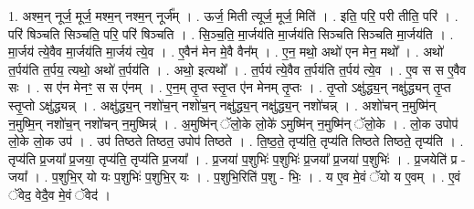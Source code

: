\documentclass[17pt]{extarticle}
\begin{document}
1. अश्म॒न् नूर्ज॒ मूर्ज॒ मश्म॒न् नश्म॒न् नूर्ज᳚म् । . ऊर्ज॒ मिती त्यूर्ज॒ मूर्ज॒ मिति॑ । . इति॒ परि॒ परी तीति॒ परि॑ । . परि॑ षिञ्चति सिञ्चति॒ परि॒ परि॑ षिञ्चति । . सि॒ञ्च॒ति॒ मा॒र्जय॑ति मा॒र्जय॑ति सिञ्चति सिञ्चति मा॒र्जय॑ति । . मा॒र्जय॑ त्ये॒वैव मा॒र्जय॑ति मा॒र्जय॑ त्ये॒व । . ए॒वैन॑ मेन मे॒वै वैन᳚म् । . ए॒न॒ मथो॒ अथो॑ एन मेन॒ मथो᳚ । . अथो॑ त॒र्पय॑ति त॒र्पय॒ त्यथो॒ अथो॑ त॒र्पय॑ति । . अथो॒ इत्यथो᳚ । . त॒र्पय॑ त्ये॒वैव त॒र्पय॑ति त॒र्पय॑ त्ये॒व । . ए॒व स स ए॒वैव सः । . स ए॑न मेनꣳ॒॒ स स ए॑नम् । . ए॒न॒म् तृ॒प्त स्तृ॒प्त ए॑न मेनम् तृ॒प्तः । . तृ॒प्तो ऽक्षु॑द्ध्य॒न् नक्षु॑द्ध्यन् तृ॒प्त स्तृ॒प्तो ऽक्षु॑द्ध्यन्न् । . अक्षु॑द्ध्य॒न् नशो॑च॒न् नशो॑च॒न् नक्षु॑द्ध्य॒न् नक्षु॑द्ध्य॒न् नशो॑चन्न् । . अशो॑चन् न॒मुष्मि॑न् न॒मुष्मि॒न् नशो॑च॒न् नशो॑चन् न॒मुष्मिन्न्॑ । . अ॒मुष्मि॑न् ॅलो॒के लो॒के॑ ऽमुष्मि॑न् न॒मुष्मि॑न् ॅलो॒के । . लो॒क उपोप॑ लो॒के लो॒क उप॑ । . उप॑ तिष्ठते तिष्ठत॒ उपोप॑ तिष्ठते । . ति॒ष्ठ॒ते॒ तृप्य॑ति॒ तृप्य॑ति तिष्ठते तिष्ठते॒ तृप्य॑ति । . तृप्य॑ति प्र॒जया᳚ प्र॒जया॒ तृप्य॑ति॒ तृप्य॑ति प्र॒जया᳚ । . प्र॒जया॑ प॒शुभिः॑ प॒शुभिः॑ प्र॒जया᳚ प्र॒जया॑ प॒शुभिः॑ । . प्र॒जयेति॑ प्र - जया᳚ । . प॒शुभि॒र् यो यः प॒शुभिः॑ प॒शुभि॒र् यः । . प॒शुभि॒रिति॑ प॒शु - भिः॒ । . य ए॒व मे॒वं ॅयो य ए॒वम् । . ए॒वं ॅवेद॒ वेदै॒व मे॒वं ॅवेद॑ । \newline
\end{document}
